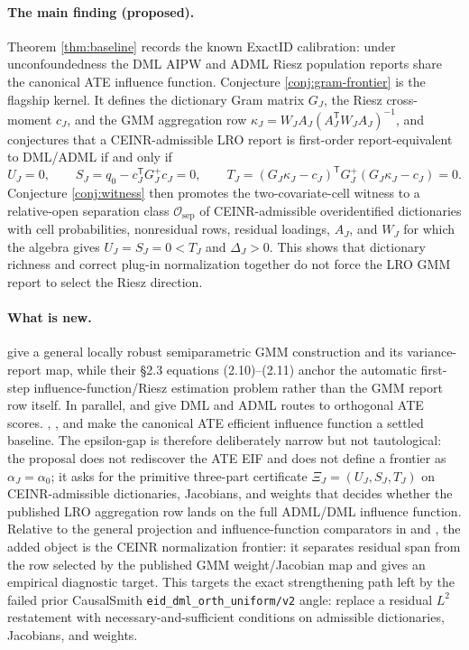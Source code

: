 \documentclass[11pt]{article}
\newcommand{\transpose}{\mathsf{T}}
\theoremstyle{definition}
\theoremstyle{plain}
\theoremstyle{remark}
\begin{document}
\paragraph{The main finding (proposed).}
Theorem \ref{thm:baseline} records the known ExactID calibration: under
unconfoundedness the DML AIPW and ADML Riesz population reports share the
canonical ATE influence function.  Conjecture \ref{conj:gram-frontier} is the
flagship kernel.  It defines the dictionary Gram matrix \(G_J\), the Riesz
cross-moment \(c_J\), and the GMM aggregation row
\(\kappa_J=W_JA_J(A_J^\transpose W_JA_J)^{-1}\), and conjectures that a
CEINR-admissible LRO report is first-order report-equivalent to DML/ADML if
and only if
\[
U_J=0,\qquad S_J=q_0-c_J^\transpose G_J^+c_J=0,\qquad
T_J=(G_J\kappa_J-c_J)^\transpose G_J^+(G_J\kappa_J-c_J)=0.
\]
Conjecture \ref{conj:witness} then promotes the two-covariate-cell witness to a
relative-open separation class \(\mathcal O_{\mathrm{sep}}\) of
CEINR-admissible overidentified dictionaries with cell probabilities,
nonresidual rows, residual loadings, \(A_J\), and \(W_J\) for which the algebra
gives \(U_J=S_J=0<T_J\) and \(\Delta_J>0\).  This shows that dictionary richness
and correct plug-in normalization together do not force the LRO GMM report to
select the Riesz direction.

\paragraph{What is new.}
\citet[\S2, eqs.\ (2.2)--(2.3), and \S2, eq.\ (2.8)]{ChernozhukovEscancianoIchimuraNeweyRobins2022LRO} give a
general locally robust semiparametric GMM construction and its variance-report
map, while their \S2.3 equations (2.10)--(2.11) anchor the automatic
first-step influence-function/Riesz estimation problem rather than the GMM
report row itself.  In parallel,
\citet[\S3]{ChernozhukovEtAl2018DML} and
\citet[\S2--\S3]{ChernozhukovNeweySingh2022AutoDML} give DML and ADML routes to
orthogonal ATE scores.  \citet{Newey1994Econometrica},
\citet{Hahn1998Econometrica}, and \citet{HiranoImbensRidder2003Econometrica}
make the canonical ATE efficient influence function a settled baseline.  The
epsilon-gap is therefore deliberately narrow but not tautological: the proposal
does not rediscover the ATE EIF and does not define a frontier as
\(\alpha_J=\alpha_0\); it asks for the primitive three-part certificate
\(\Xi_J=(U_J,S_J,T_J)\) on CEINR-admissible dictionaries, Jacobians, and weights
that decides whether the published LRO aggregation row lands on the full
ADML/DML influence function.  Relative to the general projection and
influence-function comparators in \citet[\S3--\S4]{Newey1994Econometrica} and
\citet[\S2--\S4]{IchimuraNewey2022QE}, the added object is the CEINR
normalization frontier: it separates residual span from the row selected by
the published GMM weight/Jacobian map and gives an empirical diagnostic target.
This targets the exact strengthening path left by the failed
prior CausalSmith \texttt{eid\_dml\_orth\_uniform/v2} angle: replace a residual
\(L^2\) restatement with necessary-and-sufficient conditions on admissible
dictionaries, Jacobians, and weights.
\end{document}

